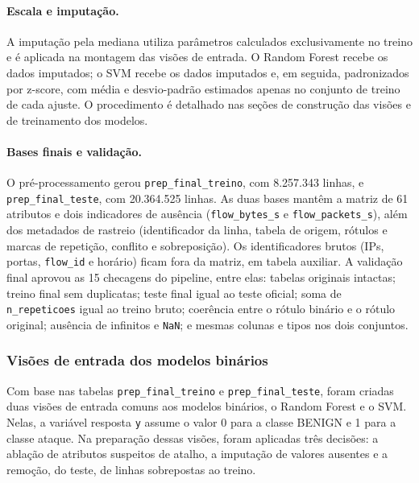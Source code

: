 \documentclass[
    12pt,                %
    openright,           %
    oneside,             %
    a4paper,             %
    english,             %
    brazil               %
]{abntex2}
\begin{document}
\paragraph{Escala e imputação.}
A imputação pela mediana utiliza parâmetros calculados exclusivamente no treino e é aplicada na montagem das visões de entrada. O Random Forest recebe os dados imputados; o SVM recebe os dados imputados e, em seguida, padronizados por z-score, com média e desvio-padrão estimados apenas no conjunto de treino de cada ajuste. O procedimento é detalhado nas seções de construção das visões e de treinamento dos modelos.

\paragraph{Bases finais e validação.}
O pré-processamento gerou \texttt{prep\_final\_treino}, com 8.257.343 linhas, e \texttt{prep\_final\_teste}, com 20.364.525 linhas. As duas bases mantêm a matriz de 61 atributos e dois indicadores de ausência (\texttt{flow\_bytes\_s} e \texttt{flow\_packets\_s}), além dos metadados de rastreio (identificador da linha, tabela de origem, rótulos e marcas de repetição, conflito e sobreposição). Os identificadores brutos (IPs, portas, \texttt{flow\_id} e horário) ficam fora da matriz, em tabela auxiliar. A validação final aprovou as 15 checagens do pipeline, entre elas: tabelas originais intactas; treino final sem duplicatas; teste final igual ao teste oficial; soma de \texttt{n\_repeticoes} igual ao treino bruto; coerência entre o rótulo binário e o rótulo original; ausência de infinitos e \texttt{NaN}; e mesmas colunas e tipos nos dois conjuntos.

\subsubsection{Visões de entrada dos modelos binários}
\label{sec:visoes-modelos-binario}

Com base nas tabelas \texttt{prep\_final\_treino} e \texttt{prep\_final\_teste}, foram criadas duas visões de entrada comuns aos modelos binários, o Random Forest e o SVM. Nelas, a variável resposta \texttt{y} assume o valor 0 para a classe BENIGN e 1 para a classe ataque. Na preparação dessas visões, foram aplicadas três decisões: a ablação de atributos suspeitos de atalho, a imputação de valores ausentes e a remoção, do teste, de linhas sobrepostas ao treino.
\end{document}
